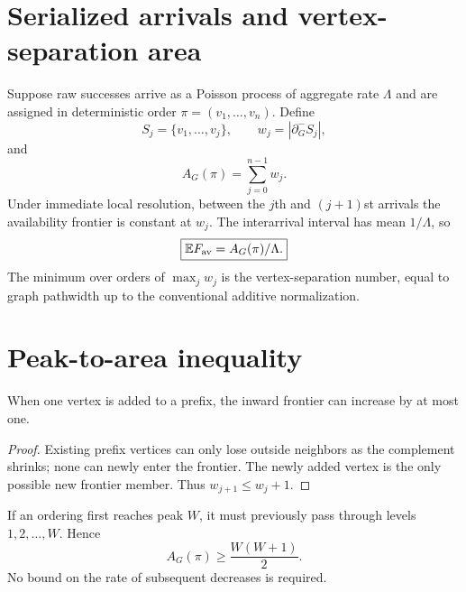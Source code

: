 \documentclass[aps,prx,preprint,superscriptaddress,nofootinbib,longbibliography]{revtex4-2}
\newcommand{\E}{\mathbb E}\newcommand{\Prob}{\mathbb P}\newcommand{\pw}{\operatorname{pw}}\newcommand{\tw}{\operatorname{tw}}
\begin{document}
\section{Serialized arrivals and vertex-separation area}
Suppose raw successes arrive as a Poisson process of aggregate rate $\Lambda$ and are assigned in deterministic order $\pi=(v_1,\ldots,v_n)$. Define
\begin{equation}
S_j=\{v_1,\ldots,v_j\},\qquad w_j=|\partial_G^-S_j|,
\end{equation}
and
\begin{equation}
A_G(\pi)=\sum_{j=0}^{n-1}w_j.
\end{equation}
Under immediate local resolution, between the $j$th and $(j+1)$st arrivals the availability frontier is constant at $w_j$. The interarrival interval has mean $1/\Lambda$, so
\begin{equation}
\boxed{\E F_{\rm av}=A_G(\pi)/\Lambda.}
\end{equation}
The minimum over orders of $\max_jw_j$ is the vertex-separation number, equal to graph pathwidth up to the conventional additive normalization.

\section{Peak-to-area inequality}
\begin{lemma}
When one vertex is added to a prefix, the inward frontier can increase by at most one.
\end{lemma}
\begin{proof}
Existing prefix vertices can only lose outside neighbors as the complement shrinks; none can newly enter the frontier. The newly added vertex is the only possible new frontier member. Thus $w_{j+1}\le w_j+1$.
\end{proof}
If an ordering first reaches peak $W$, it must previously pass through levels $1,2,\ldots,W$. Hence
\begin{equation}
\boxed{A_G(\pi)\ge\frac{W(W+1)}2.}
\end{equation}
No bound on the rate of subsequent decreases is required.
\end{document}
